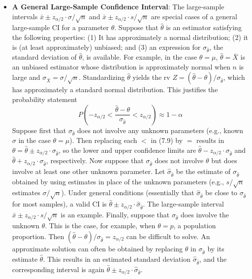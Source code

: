\documentclass{report}
\begin{document}
\begin{itemize}
        \item \textbf{A General Large-Sample Confidence Interval}:
            The large-sample intervals $\bar{x} \pm z_{\alpha/2} \cdot \sigma/\sqrt{n}$ and $\bar{x} \pm z_{\alpha/2} \cdot s/\sqrt{n}$ are special cases of a general large-sample CI for a parameter $\theta$. Suppose that $\hat{\theta}$ is an estimator satisfying the following properties: (1) It has approximately a normal distribution; (2) it is (at least approximately) unbiased; and (3) an expression for $\sigma_{\hat{\theta}}$, the standard deviation of $\hat{\theta}$, is available. For example, in the case $\theta = \mu$, $\hat{\theta} = \bar{X}$ is an unbiased estimator whose distribution is approximately normal when $n$ is large and $\sigma_{\bar{X}} = \sigma/\sqrt{n}$. Standardizing $\hat{\theta}$ yields the rv $Z = (\hat{\theta} - \theta)/\sigma_{\hat{\theta}}$, which has approximately a standard normal distribution. This justifies the probability statement
            \[
                P\left( -z_{\alpha/2} < \frac{\hat{\theta} - \theta}{\sigma_{\hat{\theta}}} < z_{\alpha/2} \right) \approx 1 - \alpha \tag{7.9}
            \]
            Suppose first that $\sigma_{\hat{\theta}}$ does not involve any unknown parameters (e.g., known $\sigma$ in the case $\theta = \mu$). Then replacing each $<$ in (7.9) by $=$ results in $\theta = \hat{\theta} \pm z_{\alpha/2} \cdot \sigma_{\hat{\theta}}$, so the lower and upper confidence limits are $\hat{\theta} - z_{\alpha/2} \cdot \sigma_{\hat{\theta}}$ and $\hat{\theta} + z_{\alpha/2} \cdot \sigma_{\hat{\theta}}$, respectively. Now suppose that $\sigma_{\hat{\theta}}$ does not involve $\theta$ but does involve at least one other unknown parameter. Let $\hat{\sigma}_{\hat{\theta}}$ be the estimate of $\sigma_{\hat{\theta}}$ obtained by using estimates in place of the unknown parameters (e.g., $s/\sqrt{n}$ estimates $\sigma/\sqrt{n}$). Under general conditions (essentially that $\hat{\sigma}_{\hat{\theta}}$ be close to $\sigma_{\hat{\theta}}$ for most samples), a valid CI is $\hat{\theta} \pm z_{\alpha/2} \cdot \hat{\sigma}_{\hat{\theta}}$. The large-sample interval $\bar{x} \pm z_{\alpha/2} \cdot s/\sqrt{n}$ is an example.
            \bigbreak \noindent 
            Finally, suppose that $\sigma_{\hat{\theta}}$ does involve the unknown $\theta$. This is the case, for example, when $\theta = p$, a population proportion. Then $(\hat{\theta} - \theta)/\sigma_{\hat{\theta}} = z_{\alpha/2}$ can be difficult to solve. An approximate solution can often be obtained by replacing $\theta$ in $\sigma_{\hat{\theta}}$ by its estimate $\hat{\theta}$. This results in an estimated standard deviation $\hat{\sigma}_{\hat{\theta}}$, and the corresponding interval is again $\hat{\theta} \pm z_{\alpha/2} \cdot \hat{\sigma}_{\hat{\theta}}$.

\end{itemize}
\end{document}
